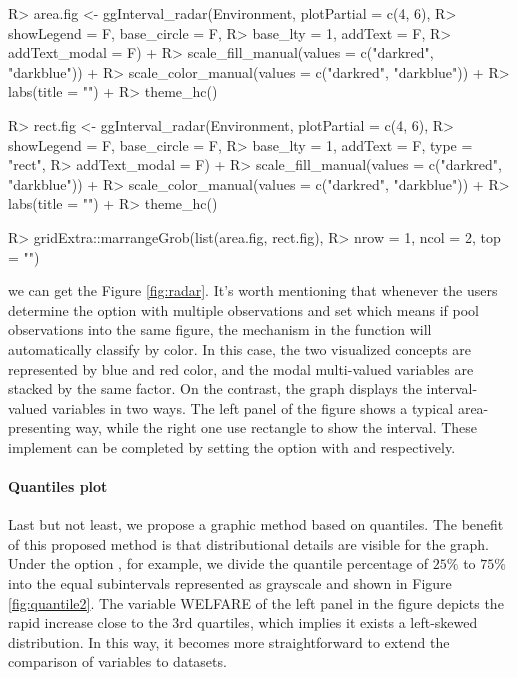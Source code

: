 \documentclass[article]{jss}
\begin{document}
\begin{CodeChunk}
\begin{CodeInput}
R> area.fig <- ggInterval_radar(Environment, plotPartial = c(4, 6),
R>                              showLegend = F, base_circle = F,
R>                              base_lty = 1, addText = F,
R>                              addText_modal = F) +
R>             scale_fill_manual(values = c("darkred", "darkblue")) +
R>             scale_color_manual(values = c("darkred", "darkblue")) +
R>             labs(title = "") +
R>             theme_hc()

R> rect.fig <- ggInterval_radar(Environment, plotPartial = c(4, 6),
R>                              showLegend = F, base_circle = F,
R>                              base_lty = 1, addText = F, type = "rect",
R>                              addText_modal = F) +
R>             scale_fill_manual(values = c("darkred", "darkblue")) +
R>             scale_color_manual(values = c("darkred", "darkblue")) +
R>             labs(title = "") +
R>             theme_hc()

R> gridExtra::marrangeGrob(list(area.fig, rect.fig), 
R>                         nrow = 1, ncol = 2, top = "")
\end{CodeInput}
\end{CodeChunk}

we can get the Figure \ref{fig:radar}. It's worth mentioning that whenever the users determine the option  with multiple observations and set  which means if pool observations into the same figure, the mechanism in the function will automatically classify by color. In this case, the two visualized concepts are represented by blue and red color, and the modal multi-valued variables are stacked by the same factor. On the contrast, the graph displays the interval-valued variables in two ways. The left panel of the figure shows a typical area-presenting way, while the right one use rectangle to show the interval. These implement can be completed by setting the option  with  and  respectively.




\paragraph{Quantiles plot}
Last but not least, we propose a graphic method based on quantiles. The benefit of this proposed method is that distributional details are visible for the graph. Under the option , for example, we divide the quantile percentage of $25\%$ to $75\%$ into the equal subintervals represented as grayscale and shown in Figure \ref{fig:quantile2}. The variable WELFARE of the left panel in the figure depicts the rapid increase close to the 3rd quartiles, which implies it exists a left-skewed distribution. In this way, it becomes more straightforward to extend the comparison of variables to datasets.
\end{document}
